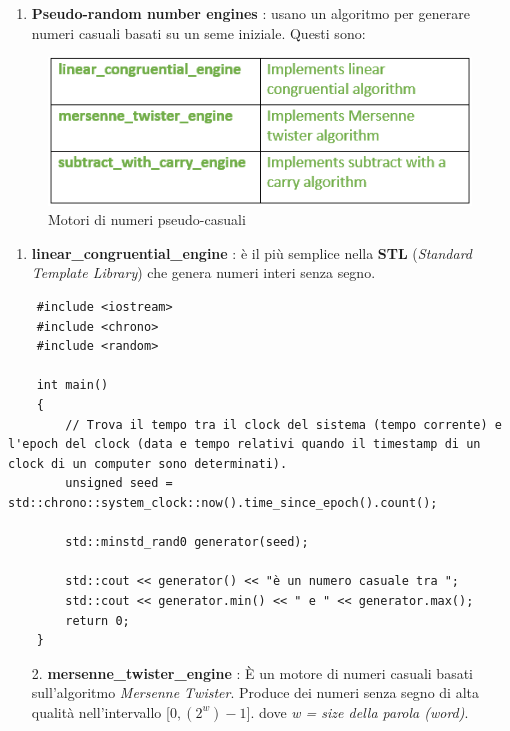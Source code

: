 \begin{enumerate}[I]
	\item \textsf{\small \textbf{Pseudo-random number engines} : usano un algoritmo per generare numeri casuali basati su un seme iniziale. Questi sono: }
\end{enumerate}

\begin{figure}[ht]
	\centering
	\includegraphics[width=1.2\textwidth, height=1.2\textheight, keepaspectratio]{./imgs/random-number-engines.png}
	\caption{Motori di numeri pseudo-casuali}
	\label{fig:random-number-engines}
\end{figure}

\begin{enumerate}
	\item \textsf{\small \textbf{linear\_congruential\_engine} : è il più semplice nella \textbf{STL} (\emph{Standard Template Library}) che genera numeri interi senza segno.}
\end{enumerate}

\begin{lstlisting}
	#include <iostream>
	#include <chrono>
	#include <random>
	
	int main()
	{
		// Trova il tempo tra il clock del sistema (tempo corrente) e l'epoch del clock (data e tempo relativi quando il timestamp di un clock di un computer sono determinati).
		unsigned seed = std::chrono::system_clock::now().time_since_epoch().count();
		
		std::minstd_rand0 generator(seed);
		
		std::cout << generator() << "è un numero casuale tra ";
		std::cout << generator.min() << " e " << generator.max();
		return 0;
	}
\end{lstlisting}

\begin{enumerate}
	\item[2.] \textsf{\small \textbf{mersenne\_twister\_engine} : È un motore di numeri casuali basati sull'algoritmo \emph{Mersenne Twister}. Produce dei numeri senza segno di alta qualità nell'intervallo [$0, (2^w)-1]$. dove \emph{w = size della parola (word)}.} \\
\end{enumerate}

